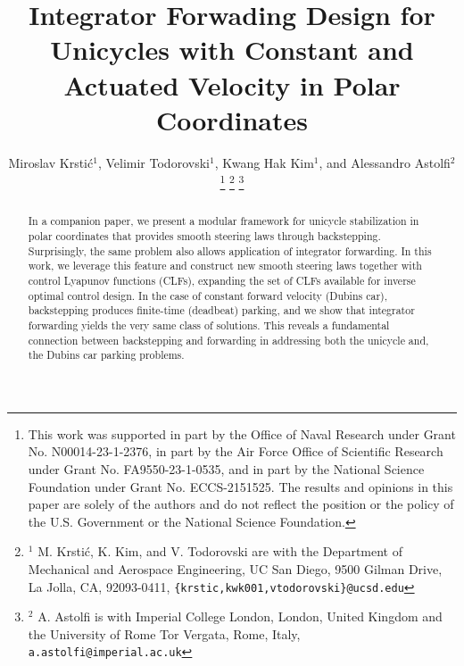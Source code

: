 \documentclass[letterpaper, 10 pt, conference]{ieeeconf}  %
\title{\LARGE \bf
Integrator Forwading Design for Unicycles with Constant and Actuated Velocity in Polar Coordinates
}
\author{Miroslav Krstić$^{1}$, Velimir Todorovski$^{1}$, Kwang Hak Kim$^{1}$, and Alessandro Astolfi$^{2}$ %
\thanks{This work was supported in part by the Office of Naval Research under Grant No. N00014-23-1-2376, in part by the Air Force Office of Scientific Research under Grant No. FA9550-23-1-0535, and in
part by the National Science Foundation under Grant No. ECCS-2151525. The results and opinions in this paper are solely of the authors and do not reflect the position or the policy of the U.S. Government or the National Science
Foundation.}%
\thanks{$^{1}$ M. Krstić, K. Kim, and V. Todorovski are with the Department of Mechanical and Aerospace Engineering, UC San Diego, 9500 Gilman Drive, La Jolla, CA, 92093-0411, {\tt\small \{krstic,kwk001,vtodorovski\}@ucsd.edu}}%
\thanks{$^{2}$ A. Astolfi is with  Imperial College London, London,
United Kingdom and the University of Rome Tor Vergata, Rome, Italy,
{\tt\small a.astolfi@imperial.ac.uk}}%
}
\begin{document}
\maketitle
\thispagestyle{empty}
\pagestyle{empty}



\begin{abstract}
In a companion paper, we present a modular framework for unicycle stabilization in polar coordinates that provides smooth steering laws through backstepping. Surprisingly, the same problem also allows application of integrator forwarding. In this work, we leverage this feature and construct new smooth steering laws together with control Lyapunov functions (CLFs), expanding the set of CLFs available for inverse optimal control design. In the case of constant forward velocity (Dubins car), backstepping produces finite-time (deadbeat) parking, and we show that integrator forwarding yields the very same class of solutions. This reveals a fundamental connection between backstepping and forwarding in addressing both the unicycle and, the Dubins car parking problems.
\end{abstract}


\end{document}
